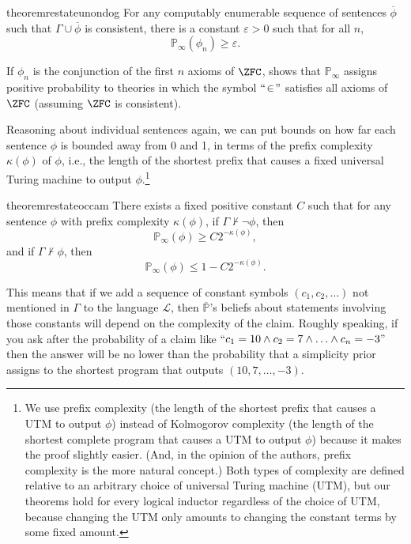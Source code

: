 \documentclass[authordate,onecolumn,noenvironments]{miri-tech-article}
\numberwithin{equation}{subsection}
\newcommand{\quot}[1]{``#1"}
\newcommand{\seq}[1]{{\overline{#1}}}
\newcommand{\nn}{n}
\newcommand{\phis}{\seq{\phi}}
\newcommand{\li}{logical inductor}
\newcommand{\rparenthetical}[1]{\hfill\upshape{{\small (#1)}}} %
\newcommand{\proofin}[1]{\rparenthetical{Proof in:~#1.}}
\newcommand{\BelState}{\mathbb{P}}
\newcommand{\pt}{\BelState}
\newcommand{\MP}{\seq{\pt}}
\newcommand{\Theory}{\Gamma}
\newcommand{\Lang}{\mathcal{L}}
\begin{document}
\begin{restatable}{theorem}{restateunondog}\label{thm:obu}
  For any computably enumerable sequence of sentences $\phis$ such that $\Theory\cup\phis$ is consistent, there is a constant $\varepsilon>0$ such that for all $\nn$,
  \[
    \pt_\infty(\phi_\nn)\geq \varepsilon.
  \]
    \proofin{\ref{app:obu}}
\end{restatable}

\noindent If $\phi_\nn$ is the conjunction of the first $\nn$ axioms of $\ZFC$,  shows that $\pt_\infty$ assigns positive probability to theories in which the symbol $\quot{\!\in\!}$ satisfies all axioms of $\ZFC$ (assuming $\ZFC$ is consistent).

Reasoning about individual sentences again, we can put bounds on how far each sentence $\phi$ is bounded away from 0 and 1, in terms of the prefix complexity $\kappa(\phi)$ of $\phi$, i.e., the length of the shortest prefix that causes a fixed universal Turing machine to output $\phi$.\footnote{We use prefix complexity (the length of the shortest prefix that causes a UTM to output $\phi$) instead of Kolmogorov complexity (the length of the shortest complete program that causes a UTM to output $\phi$) because it makes the proof slightly easier. (And, in the opinion of the authors, prefix complexity is the more natural concept.) Both types of complexity are defined relative to an arbitrary choice of universal Turing machine (UTM), but our theorems hold for every \li{} regardless of the choice of UTM, because changing the UTM only amounts to changing the constant terms by some fixed amount.}

\begin{restatable}{theorem}{restateoccam}\label{thm:ob}
 There exists a fixed positive constant $C$ such that for any sentence $\phi$ with prefix complexity $\kappa(\phi)$, if $\Theory\nvdash\neg\phi$, then \[\pt_\infty(\phi)\geq C2^{-\kappa(\phi)},\] and if $\Theory\nvdash\phi$, then \[\pt_\infty(\phi)\leq 1-C2^{-\kappa(\phi)}.\]
     \proofin{\ref{app:ob}}
\end{restatable}

This means that if we add a sequence of constant symbols $(c_1, c_2, \ldots)$ not mentioned in $\Theory$ to the language $\Lang$, then $\MP$'s beliefs about statements involving those constants will depend on the complexity of the claim. Roughly speaking, if you ask after the probability of a claim like $\quot{c_1 = 10 \land c_2 = 7 \land \ldots \land c_n = -3}$ then the answer will be no lower than the probability that a simplicity prior assigns to the shortest program that outputs $(10, 7, \ldots, -3)$.
\end{document}
